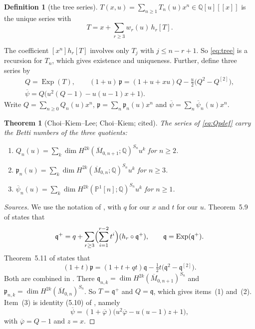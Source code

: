 \documentclass[11pt]{amsart}
\newtheorem{theorem}{Theorem}[section]
\theoremstyle{definition}
\newtheorem*{definition*}{Definition}
\theoremstyle{remark}
\numberwithin{equation}{section}
\DeclareMathOperator{\Exp}{Exp}
\newcommand{\Mbar}{\overline{M}}
\newcommand{\PP}{\mathbb{P}}
\newcommand{\QQ}{\mathbb{Q}}
\newcommand{\pp}{\mathfrak{p}}
\newcommand{\psibar}{\overline{\psi}}
\begin{document}
\begin{definition*}[the tree series]
\(T(x,u)=\sum_{n\ge1}T_n(u)x^n\in\QQ[u][[x]]\) is the unique series with
\begin{equation}\label{eq:tree}
T=x+\sum_{r\ge3}w_r(u)\,h_r[T].
\end{equation}
\end{definition*}

The coefficient \([x^n]h_r[T]\) involves only \(T_j\) with \(j\le n-r+1\). So \eqref{eq:tree} is a recursion for \(T_n\), which gives existence and uniqueness. Further, define three series by
\begin{equation}\label{eq:Qpdef}
\begin{gathered}
Q=\Exp(T),\qquad (1+u)\,\pp=(1+u+xu)Q-\frac u2\bigl(Q^2-Q^{[2]}\bigr),\\
\psibar=Q\bigl(u^2(Q-1)-u(u-1)x+1\bigr).
\end{gathered}
\end{equation}
Write \(Q=\sum_{n\ge0}Q_n(u)x^n\), \(\pp=\sum_n\pp_n(u)x^n\) and \(\psibar=\sum_n\psibar_n(u)x^n\).

\begin{theorem}[Choi--Kiem--Lee; Choi--Kiem; cited]\label{thm:CKL}
The series of \eqref{eq:Qpdef} carry the Betti numbers of the three quotients:
\begin{enumerate}
\item \(Q_n(u)=\sum_k\dim H^{2k}(\Mbar_{0,n+1};\QQ)^{S_n}u^k\) for \(n\ge2\).
\item \(\pp_n(u)=\sum_k\dim H^{2k}(\Mbar_{0,n};\QQ)^{S_n}u^k\) for \(n\ge3\).
\item \(\psibar_n(u)=\sum_k\dim H^{2k}(\PP^1[n];\QQ)^{S_n}u^k\) for \(n\ge1\).
\end{enumerate}
\end{theorem}

\begin{proof}[Sources]
We use the notation of \cite{CKL}, with \(q\) for our \(x\) and \(t\) for our \(u\). Theorem~5.9 of \cite{CKL} states that
\[
\mathfrak{q}^+=q+\sum_{r\ge3}\Bigl(\sum_{i=1}^{r-2}t^i\Bigr)(h_r\circ\mathfrak{q}^+),\qquad \mathfrak{q}=\Exp(\mathfrak{q}^+).
\]
Theorem~5.11 of \cite{CKL} states that
\[
(1+t)\pp=(1+t+qt)\mathfrak{q}-\tfrac12t\bigl(\mathfrak{q}^2-\mathfrak{q}^{[2]}\bigr).
\]
Both are combined in \cite[Thm.~1.7]{CKL}. There \(\mathfrak{q}_{n,k}=\dim H^{2k}(\Mbar_{0,n+1})^{S_n}\) and \(\pp_{n,k}=\dim H^{2k}(\Mbar_{0,n})^{S_n}\). So \(T=\mathfrak{q}^+\) and \(Q=\mathfrak{q}\), which gives items~(1) and~(2). Item~(3) is identity (5.10) of \cite[Appendix]{CK}, namely
\[
\psibar=(1+\overline{\varphi})\bigl(u^2\overline{\varphi}-u(u-1)z+1\bigr),
\]
with \(\overline{\varphi}=Q-1\) and \(z=x\).
\end{proof}
\end{document}
